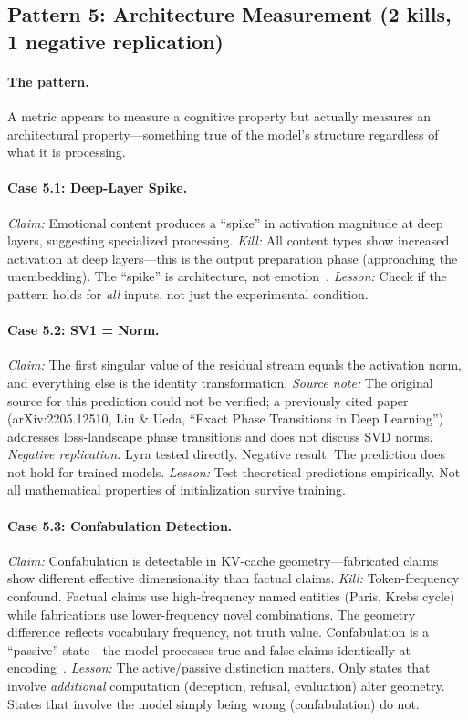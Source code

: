 \documentclass[11pt,a4paper]{article}
\begin{document}
\subsection{Pattern 5: Architecture Measurement (2 kills, 1 negative replication)}

\paragraph{The pattern.} A metric appears to measure a cognitive
property but actually measures an architectural property---something
true of the model's structure regardless of what it is processing.

\paragraph{Case 5.1: Deep-Layer Spike.}
\emph{Claim:} Emotional content produces a ``spike'' in activation
magnitude at deep layers, suggesting specialized processing.
\emph{Kill:} All content types show increased activation at deep
layers---this is the output preparation phase (approaching the
unembedding). The ``spike'' is architecture, not
emotion~\citep{elhage2022superposition}.
\emph{Lesson:} Check if the pattern holds for \emph{all} inputs, not
just the experimental condition.

\paragraph{Case 5.2: SV1 = Norm.}
\emph{Claim:} The first singular value of the residual stream equals the
activation norm, and everything else is the identity transformation.
\emph{Source note:} The original source for this prediction could not be
verified; a previously cited paper (arXiv:2205.12510, Liu \& Ueda,
``Exact Phase Transitions in Deep Learning'') addresses loss-landscape
phase transitions and does not discuss SVD norms.
\emph{Negative replication:} Lyra tested directly. Negative result. The
prediction does not hold for trained models.
\emph{Lesson:} Test theoretical predictions empirically. Not all
mathematical properties of initialization survive training.

\paragraph{Case 5.3: Confabulation Detection.}
\emph{Claim:} Confabulation is detectable in KV-cache geometry---fabricated
claims show different effective dimensionality than factual claims.
\emph{Kill:} Token-frequency confound. Factual claims use
high-frequency named entities (Paris, Krebs cycle) while fabrications use
lower-frequency novel combinations. The geometry difference reflects
vocabulary frequency, not truth value. Confabulation is a ``passive''
state---the model processes true and false claims identically at
encoding~\citep{lyra2026spectral}.
\emph{Lesson:} The active/passive distinction matters. Only states that
involve \emph{additional} computation (deception, refusal, evaluation)
alter geometry. States that involve the model simply being wrong
(confabulation) do not.
\end{document}
